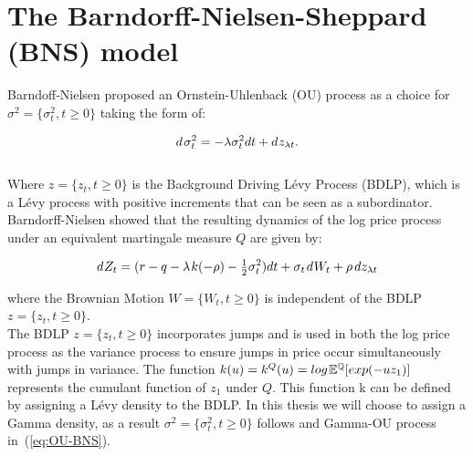 
\section{The Barndorff-Nielsen-Sheppard (BNS) model}

Barndoff-Nielsen proposed an Ornstein-Uhlenback (OU) process as a choice for $\sigma^2=\{\sigma_{t}^2,t\geq 0\}$ taking the form of:

\begin{equation}
    d\hspace{0.1em}\sigma_{t}^2=-\lambda \sigma_{t}^2dt + d\hspace{0.05em} z_{\lambda t}.
    \label{eq:4.2 variance BNS}
\end{equation}\\
Where $z=\{z_t,t\geq 0\}$ is the Background Driving Lévy Process (BDLP), which is a Lévy process with positive increments that can be seen as a subordinator. Barndorff-Nielsen showed that the resulting dynamics of the log price process under an equivalent martingale measure $Q$ are given by:

\begin{equation}
    d\hspace{0.05em} Z_{t} = (r-q-\lambda \hspace{0.08em} k(-\rho) - \tfrac{1}{2} \sigma_{t}^2)dt + \sigma_{t}\hspace{0.1em} d  \hspace{0.05em} W_{t} + \rho \hspace{0.15em} d z_{\lambda t}
    \label{eq:4.2 log-price BNS}
\end{equation}

where the Brownian Motion ${W} = \{W_{t},t\geq0\}$ is independent of the BDLP $z=\{{z}_t,t\geq 0\}$.\\

The BDLP $z=\{{z}_t,t\geq 0\}$ incorporates jumps and is used in both the log price process as the variance process to ensure jumps in price occur simultaneously with jumps in variance. The function $k(u)=k^{Q}(u) = log\hspace{0.1em}\mathbb{E}^\mathbb{Q} [ exp(-uz_{1})]$ represents the cumulant function of $ z_{1} $ under $Q$. This function k can be defined by assigning a Lévy density to the BDLP. In this thesis we will choose to assign a Gamma density, as a result $\sigma^2=\{\sigma_{t}^2,t\geq 0\}$ follows and Gamma-OU process in~(\ref{eq:OU-BNS}).\\